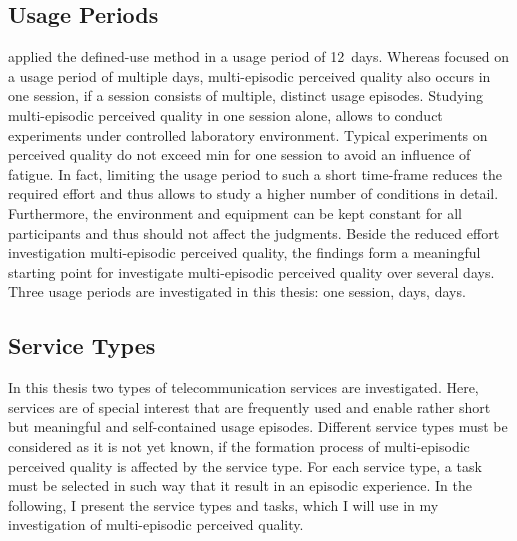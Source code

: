 \subsection{Usage Periods}
\citet{moller_single-call_2011} applied the defined-use method in a usage period of 12~days. 
Whereas \citet{moller_single-call_2011} focused on a usage period of multiple days, multi-episodic perceived quality also occurs in one session, if a session consists of multiple, distinct usage episodes.
Studying multi-episodic perceived quality in one session alone, allows to conduct experiments under controlled laboratory environment. %
Typical experiments on perceived quality do not exceed \unit[90]{min} for one session to avoid an influence of fatigue.
In fact, limiting the usage period to such a short time-frame reduces the required effort and thus allows to study a higher number of conditions in detail.
Furthermore, the environment and equipment can be kept constant for all participants and thus should not affect the judgments.
Beside the reduced effort investigation multi-episodic perceived quality, the findings form a meaningful starting point for investigate multi-episodic perceived quality over several days.
Three usage periods are investigated in this thesis: one session, \unit[6]{days}, \unit[14]{days}.

\subsection{Service Types}
In this thesis two types of telecommunication services are investigated.
Here, services are of special interest that are frequently used and enable rather short but meaningful and self-contained usage episodes.
Different service types must be considered as it is not yet known, if the formation process of multi-episodic perceived quality is affected by the service type.
For each service type, a task must be selected in such way that it result in an episodic experience.
In the following, I present the service types and tasks, which I will use in my investigation of multi-episodic perceived quality.


